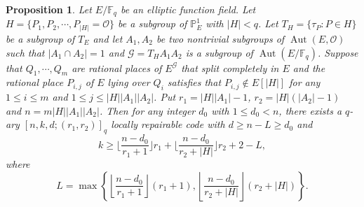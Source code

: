 \documentclass[journal,12pt,onecolumn]{IEEEtran}
\newtheorem{proposition}{Proposition}
\begin{document}
\begin{proposition}\label{cons_lrc_two}
    Let \( E/\mathbb{F}_q \) be an elliptic function field. Let \(H = \{P_1,P_2,\cdots,P_{|H|} = \mathcal{O}\}\) be a subgroup of \( \mathbb{P}^1_E \) with \( |H|<q \). Let \( T_H = \{\tau_P:P\in H\} \) be a subgroup of \( T_E \) and let \( A_1,A_2 \) be two nontrivial subgroups of \( \operatorname{Aut}(E, \mathcal{O}) \) such that \(|A_1\cap A_2| = 1\) and \( \mathcal{G} = T_H A_1 A_2 \) is a subgroup of \( \operatorname{Aut}(E/\mathbb{F}_q) \). Suppose that \( Q_1, \cdots, Q_m \) are rational places of \( E^{\mathcal{G}} \) that split completely in \( E \) and the rational place $P_{i,j}$ of $E$ lying over $Q_i$ satisfies that \(P_{i,j}\notin E[|H|]\) for any $1\le i\le m$ and \(1\le j\le |H||A_1||A_2|\). Put \( r_1 = |H||A_1| - 1 \), \( r_2 = |H|(|A_2| - 1)\) and \( n = m|H||A_1||A_2| \). Then for any integer \( d_0 \) with \( 1 \leq d_0 < n \), there exists a \( q \)-ary \([n, k, d; (r_1, r_2)]_q\) locally repairable code with \(d \ge n - L\ge d_0\) and  
    \[
        k \geq \bigg\lfloor\frac{n-d_0}{r_1 + 1}\bigg\rfloor r_1 + \bigg\lfloor\frac{n-d_0}{r_2 + |H|}\bigg\rfloor r_2  + 2 - L,
    \]
    where
    \[
        L =  \max\left\{\left\lfloor\frac{n-d_0}{r_1 + 1}\right\rfloor (r_1+1),\left\lfloor\frac{n-d_0}{r_2 + |H|}\right\rfloor (r_2 + |H|)\right\}.  
    \]
\end{proposition}
\end{document}
